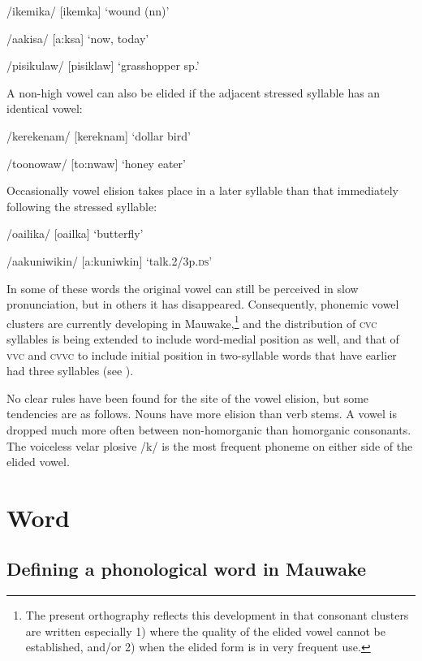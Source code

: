 /ikemika/  [i{{\textprimstress}kemka}]  `wound (nn)'

/aakisa/  [{{\textprimstress}a:ksa}]  `now, today'

/pisikulaw/  [pi{{\textprimstress}siklaw}]  `grasshopper sp.'

A non-high vowel can also be elided if the adjacent stressed syllable has an identical vowel:

/kerekenam/  [ke{{\textprimstress}reknam}]  `dollar bird'

/toonowaw/  [{{\textprimstress}to:nwaw}]  `honey eater'

Occasionally vowel elision takes place in a later syllable than that immediately following the stressed syllable: 

/o{\textphi}a{\textphi}ilika/  [o{{\textprimstress}}{\textphi}a{\textphi}ilka]  `butterfly'

/aakuniwikin/  [a:kuniwkin]  `talk.2/3p.\textsc{ds}'

In some of these words the original vowel can still be perceived in slow pronunciation, but in others it has disappeared. Consequently, phonemic vowel clusters are currently developing in Mauwake,\footnote{The present orthography reflects this development in that consonant clusters are written especially 1) where the quality of the elided vowel cannot be established, and/or 2) when the elided form is in very frequent use.} and the distribution of \textsc{cvc} syllables is being extended to include word-medial position as well, and that of \textsc{vvc} and \textsc{cvvc} to include initial position in two-syllable words that have earlier had three syllables (see ).

No clear rules have been found for the site of the vowel elision, but some tendencies are as follows. Nouns have more elision than verb stems. A vowel is dropped much more often between non-homorganic than homorganic consonants. The voiceless velar plosive /k/ is the most frequent phoneme on either side of the elided vowel.

\section{Word} 

\subsection{Defining a phonological word in Mauwake}

